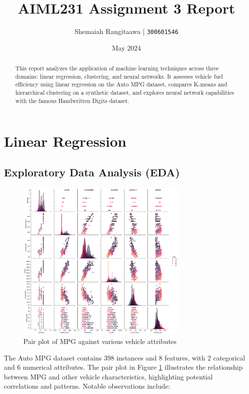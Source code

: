 \documentclass[11pt,a4paper]{article}
\title{AIML231 Assignment 3 Report}
\author{Shemaiah Rangitaawa | \texttt{300601546}}
\date{May 2024}
\begin{document}
\maketitle
\begin{abstract}
    This report analyzes the application of machine learning techniques across three domains: linear regression, clustering, and neural
    networks. It assesses vehicle fuel efficiency using linear regression on the Auto MPG dataset, compares K-means and hierarchical clustering
    on a synthetic dataset, and explores neural network capabilities with the famous Handwritten Digits dataset.
\end{abstract}

\section{Linear Regression}
\subsection{Exploratory Data Analysis (EDA)}

\begin{figure}[ht]
    \centering
    \includegraphics[width=0.75\textwidth]{images/pairplot.png}
    \caption{Pair plot of MPG against various vehicle attributes}
    \label{fig:mpgpairplot}
\end{figure}

The Auto MPG dataset contains 398 instances and 8 features, with 2 categorical and 6 numerical attributes.
The pair plot in Figure \ref{fig:mpgpairplot} illustrates the relationship between MPG and other vehicle characteristics,
highlighting potential correlations and patterns. Notable observations include:
\end{document}
